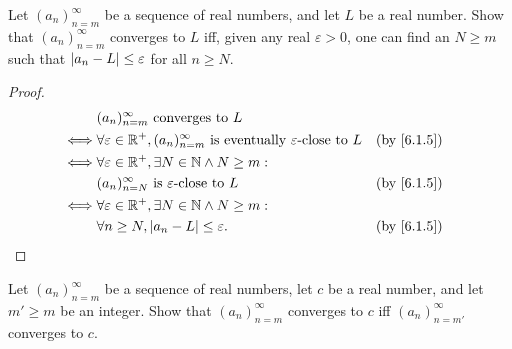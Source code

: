\begin{ex}\label{ex:6.1.2}
  Let \((a_n)_{n = m}^\infty\) be a sequence of real numbers, and let \(L\) be a real number.
  Show that \((a_n)_{n = m}^\infty\) converges to \(L\) iff, given any real \(\varepsilon > 0\), one can find an \(N \geq m\) such that \(\left\lvert a_n - L\right\rvert \leq \varepsilon\) for all \(n \geq N\).
\end{ex}

\begin{proof}
  \begin{align*}
         & (a_n)_{n = m}^\infty \text{ converges to } L                                                                             \\
    \iff & \forall \varepsilon \in \R^+, (a_n)_{n = m}^\infty \text{ is eventually } \varepsilon\text{-close to } L &  & \by{6.1.5} \\
    \iff & \forall \varepsilon \in \R^+, \exists N \in \N \land N \geq m :                                                          \\
         & (a_n)_{n = N}^\infty \text{ is } \varepsilon\text{-close to } L                                          &  & \by{6.1.5} \\
    \iff & \forall \varepsilon \in \R^+, \exists N \in \N \land N \geq m :                                                          \\
         & \forall n \geq N, \abs{a_n - L} \leq \varepsilon.                                                        &  & \by{6.1.5}
  \end{align*}
\end{proof}

\begin{ex}\label{ex:6.1.3}
  Let \((a_n)_{n = m}^\infty\) be a sequence of real numbers, let \(c\) be a real number, and let \(m' \geq m\) be an integer.
  Show that \((a_n)_{n = m}^\infty\) converges to \(c\) iff \((a_n)_{n = m'}^\infty\) converges to \(c\).
\end{ex}

